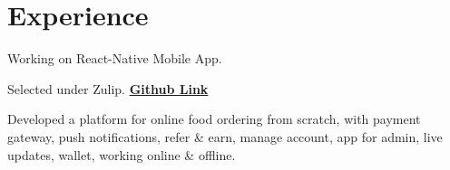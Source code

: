 \documentclass[a4paper]{deedy-resume} %
\begin{document}
\begin{minipage}[t]{0.66\textwidth} %


\section{Experience}


\vspace{\topsep} %
\begin{tightitemize}
\item Working on React-Native Mobile App.
\end{tightitemize}

\sectionspace %


\descript{}

\begin{tightitemize}
\item Selected under Zulip. \href{https://github.com/zulip/zulip-mobile}{\bf Github Link}
\end{tightitemize}

\sectionspace %



Developed a platform for online food ordering from scratch, with payment gateway, push notifications, refer \& earn, manage account, app for admin, live updates, wallet, working online \& offline.

\sectionspace %




\end{minipage}
\end{document}
